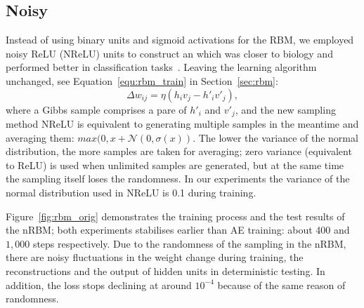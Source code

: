 \DIFdelbegin %
\DIFdelend \DIFaddbegin \subsection[Noisy RBMs]{\DIFaddend Noisy \DIFdelbegin {}\DIFdelend \DIFaddbegin {}\DIFaddend }
\label{subsec:exp_RBM}
Instead of using binary units and sigmoid activations for the RBM, we employed noisy ReLU (NReLU) units to construct an \DIFdelbegin {}\DIFdelend \DIFaddbegin {}\DIFaddend which was closer to biology and performed better in classification tasks~\citep{nair2010rectified}.
Leaving the learning algorithm unchanged, see Equation~\ref{equ:rbm_train} in Section~\ref{sec:rbm}\DIFaddbegin {}\DIFaddend :
\begin{equation}
\Delta w_{ij} = \eta (h_iv_j - h'_iv'_j),
\label{equ:rbm}
\end{equation} 
where a Gibbs sample comprises a pare of $h'_i$ and $v'_j$, and the new sampling method NReLU is equivalent to generating multiple samples in the meantime and averaging them: $max(0, x+\mathcal{N}(0, \sigma(x))$.
The lower the variance of the normal distribution, the more samples are taken for averaging;
zero variance (equivalent to ReLU) is used when unlimited samples are generated, but at the same time the sampling itself loses the randomness.
In our experiments the variance of the normal distribution used in NReLU is 0.1 during training.


Figure~\ref{fig:rbm_orig} demonstrates the training process and the test results of the nRBM; both experiments stabilises earlier than AE training: about 400 and $1,000$ steps respectively.
Due to the randomness of the sampling in the nRBM, there are noisy fluctuations in the weight change during training, the reconstructions and the output of hidden units in deterministic testing.
In addition, the loss stops declining at around $10^{-4}$ because of the same reason of randomness.

